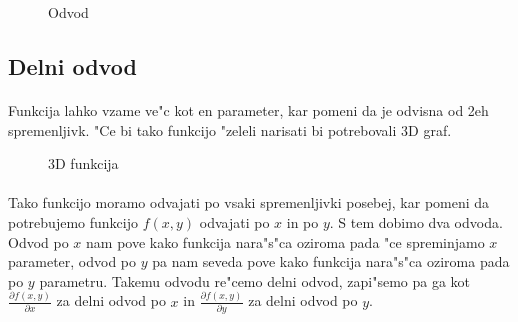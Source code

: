\documentclass[a4paper, 12pt]{article}
\begin{document}
	\begin{figure}[!h]
		\centering
		\caption{Odvod}
	\end{figure}

	\subsection*{Delni odvod}
	\paragraph{}
	Funkcija lahko vzame ve"c kot en parameter, kar pomeni da je odvisna od 2eh spremenljivk. "Ce bi tako funkcijo "zeleli narisati bi potrebovali 3D graf.

	\begin{figure}[h!]
		\centering
		\caption{3D funkcija}
	\end{figure}

	\paragraph{}
	Tako funkcijo moramo odvajati po vsaki spremenljivki posebej, kar pomeni da potrebujemo funkcijo $f(x,y)$ odvajati po $x$ in po $y$. S tem dobimo dva odvoda. Odvod po $x$ nam pove kako funkcija nara"s"ca oziroma pada "ce spreminjamo $x$ parameter, odvod po $y$ pa nam seveda pove kako funkcija nara"s"ca oziroma pada po $y$ parametru. Takemu odvodu re"cemo delni odvod, zapi"semo pa ga kot $\frac{\partial f(x,y)}{\partial x}$ za delni odvod po $x$ in $\frac{\partial f(x,y)}{\partial y}$ za delni odvod po $y$.
\end{document}
